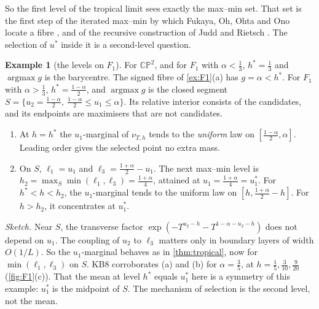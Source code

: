 \documentclass[11pt]{article}
\theoremstyle{definition}\newtheorem{definition}[theorem]{Definition}\newtheorem{remark}[theorem]{Remark}\newtheorem{example}[theorem]{Example}\newtheorem{problem}[theorem]{Open problem}\crefname{problem}{Problem}{Problems}
\begin{document}
So the first level of the tropical limit sees exactly the max--min set. That set is the first step of the iterated max--min by which
Fukaya, Oh, Ohta and Ono locate a fibre \cite{FOOO2010}, and of the recursive construction of Judd and Rietsch \cite{JuddRietsch2019}. The selection of $u^*$
inside it is a second-level question.

\begin{example}[the levels on $F_1$]\label{ex:levels}
For $\mathbb{CP}^2$, and for $F_1$ with $\alpha<\tfrac13$, $h^*=\tfrac13$ and $\operatorname{argmax}g$ is the barycentre. The signed fibre of \cref{ex:F1}(a) has $g=\alpha<h^*$. For
$F_1$ with $\alpha>\tfrac13$, $h^*=\tfrac{1-\alpha}2$, and $\operatorname{argmax}g$ is the closed segment $S=\{u_2=\tfrac{1-\alpha}2,\ \tfrac{1-\alpha}2\le u_1\le\alpha\}$. Its relative interior consists of the
candidates, and its endpoints are maximisers that are not candidates.
\begin{enumerate}
\item[(a)] At $h=h^*$ the $u_1$-marginal of $\nu_{T,h}$ tends to the \emph{uniform} law on $[\tfrac{1-\alpha}2,\alpha]$. Leading order gives the selected point no extra mass.
\item[(b)] On $S$, $\ell_1=u_1$ and $\ell_3=\tfrac{1+\alpha}2-u_1$. The next max--min level is $h_2=\max_S\min(\ell_1,\ell_3)=\tfrac{1+\alpha}4$, attained at $u_1=\tfrac{1+\alpha}4=u^*_1$. For
  $h^*<h<h_2$, the $u_1$-marginal tends to the uniform law on $[h,\tfrac{1+\alpha}2-h]$. For $h>h_2$, it concentrates at $u_1^*$.
\end{enumerate}
\emph{Sketch.} Near $S$, the transverse factor $\exp(-T^{u_2-h}-T^{1-\alpha-u_2-h})$ does not depend on $u_1$. The coupling of $u_2$ to $\ell_3$ matters only in boundary layers of width
$O(1/L)$. So the $u_1$-marginal behaves as in \cref{thm:tropical}, now for $\min(\ell_1,\ell_3)$ on $S$.
KB8 corroborates (a) and (b) for $\alpha=\tfrac35$, at $h=\tfrac15,\tfrac3{10},\tfrac9{20}$ (\cref{fig:F1}(c)). That the mean at level $h^*$ equals $u_1^*$ here is a symmetry of this
example: $u^*_1$ is the midpoint of $S$. The mechanism of selection is the second level, not the mean.
\end{example}
\end{document}
